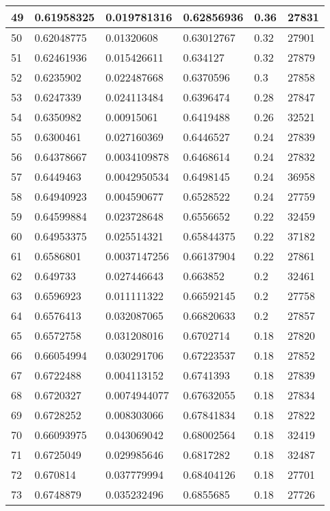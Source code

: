 \begin{longtable}{|l|l|l|l|l|l|}
49 & 0.61958325 & 0.019781316 & 0.62856936 & 0.36 & 27831 \\ \hline 
50 & 0.62048775 & 0.01320608 & 0.63012767 & 0.32 & 27901 \\ \hline 
51 & 0.62461936 & 0.015426611 & 0.634127 & 0.32 & 27879 \\ \hline 
52 & 0.6235902 & 0.022487668 & 0.6370596 & 0.3 & 27858 \\ \hline 
53 & 0.6247339 & 0.024113484 & 0.6396474 & 0.28 & 27847 \\ \hline 
54 & 0.6350982 & 0.00915061 & 0.6419488 & 0.26 & 32521 \\ \hline 
55 & 0.6300461 & 0.027160369 & 0.6446527 & 0.24 & 27839 \\ \hline 
56 & 0.64378667 & 0.0034109878 & 0.6468614 & 0.24 & 27832 \\ \hline 
57 & 0.6449463 & 0.0042950534 & 0.6498145 & 0.24 & 36958 \\ \hline 
58 & 0.64940923 & 0.004590677 & 0.6528522 & 0.24 & 27759 \\ \hline 
59 & 0.64599884 & 0.023728648 & 0.6556652 & 0.22 & 32459 \\ \hline 
60 & 0.64953375 & 0.025514321 & 0.65844375 & 0.22 & 37182 \\ \hline 
61 & 0.6586801 & 0.0037147256 & 0.66137904 & 0.22 & 27861 \\ \hline 
62 & 0.649733 & 0.027446643 & 0.663852 & 0.2 & 32461 \\ \hline 
63 & 0.6596923 & 0.011111322 & 0.66592145 & 0.2 & 27758 \\ \hline 
64 & 0.6576413 & 0.032087065 & 0.66820633 & 0.2 & 27857 \\ \hline 
65 & 0.6572758 & 0.031208016 & 0.6702714 & 0.18 & 27820 \\ \hline 
66 & 0.66054994 & 0.030291706 & 0.67223537 & 0.18 & 27852 \\ \hline 
67 & 0.6722488 & 0.004113152 & 0.6741393 & 0.18 & 27839 \\ \hline 
68 & 0.6720327 & 0.0074944077 & 0.67632055 & 0.18 & 27834 \\ \hline 
69 & 0.6728252 & 0.008303066 & 0.67841834 & 0.18 & 27822 \\ \hline 
70 & 0.66093975 & 0.043069042 & 0.68002564 & 0.18 & 32419 \\ \hline 
71 & 0.6725049 & 0.029985646 & 0.6817282 & 0.18 & 32487 \\ \hline 
72 & 0.670814 & 0.037779994 & 0.68404126 & 0.18 & 27701 \\ \hline 
73 & 0.6748879 & 0.035232496 & 0.6855685 & 0.18 & 27726 \\ \hline 

\end{longtable}
